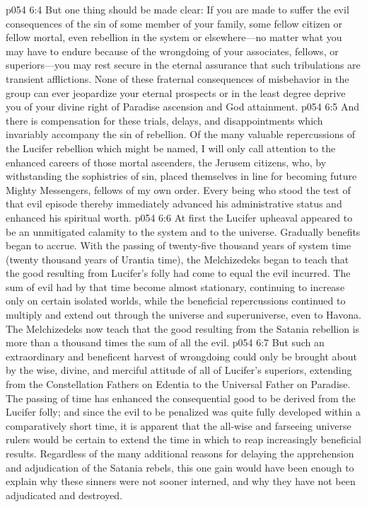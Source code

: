\vs p054 6:4 But one thing should be made clear: If you are made to suffer the evil consequences of the sin of some member of your family, some fellow citizen or fellow mortal, even rebellion in the system or elsewhere---no matter what you may have to endure because of the wrongdoing of your associates, fellows, or superiors---you may rest secure in the eternal assurance that such tribulations are transient afflictions. None of these fraternal consequences of misbehavior in the group can ever jeopardize your eternal prospects or in the least degree deprive you of your divine right of Paradise ascension and God attainment.
\vs p054 6:5 And there is compensation for these trials, delays, and disappointments which invariably accompany the sin of rebellion. Of the many valuable repercussions of the Lucifer rebellion which might be named, I will only call attention to the enhanced careers of those mortal ascenders, the Jerusem citizens, who, by withstanding the sophistries of sin, placed themselves in line for becoming future Mighty Messengers, fellows of my own order. Every being who stood the test of that evil episode thereby immediately advanced his administrative status and enhanced his spiritual worth.
\pc \vs p054 6:6 At first the Lucifer upheaval appeared to be an unmitigated calamity to the system and to the universe. Gradually benefits began to accrue. With the passing of twenty\hyp{}five thousand years of system time (twenty thousand years of Urantia time), the Melchizedeks began to teach that the good resulting from Lucifer’s folly had come to equal the evil incurred. The sum of evil had by that time become almost stationary, continuing to increase only on certain isolated worlds, while the beneficial repercussions continued to multiply and extend out through the universe and superuniverse, even to Havona. The Melchizedeks now teach that the good resulting from the Satania rebellion is more than a thousand times the sum of all the evil.
\vs p054 6:7 But such an extraordinary and beneficent harvest of wrongdoing could only be brought about by the wise, divine, and merciful attitude of all of Lucifer’s superiors, extending from the Constellation Fathers on Edentia to the Universal Father on Paradise. The passing of time has enhanced the consequential good to be derived from the Lucifer folly; and since the evil to be penalized was quite fully developed within a comparatively short time, it is apparent that the all\hyp{}wise and farseeing universe rulers would be certain to extend the time in which to reap increasingly beneficial results. Regardless of the many additional reasons for delaying the apprehension and adjudication of the Satania rebels, this one gain would have been enough to explain why these sinners were not sooner interned, and why they have not been adjudicated and destroyed.
